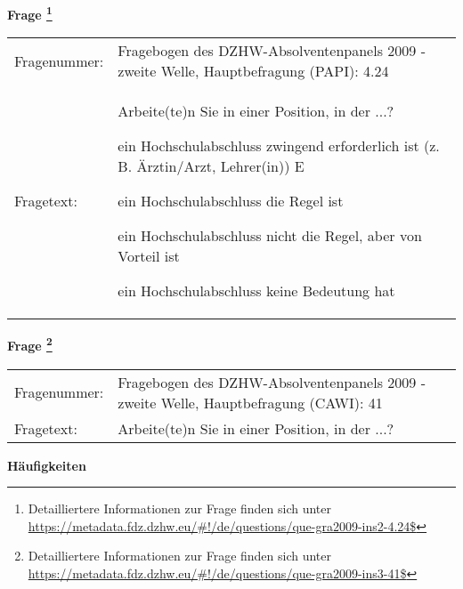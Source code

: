 				\vspace*{0.5cm}
                \noindent\textbf{Frage
	                \footnote{Detailliertere Informationen zur Frage finden sich unter
		              \url{https://metadata.fdz.dzhw.eu/\#!/de/questions/que-gra2009-ins2-4.24$}}}\\
				\begin{tabularx}{\hsize}{@{}lX}
					Fragenummer: &
					  Fragebogen des DZHW-Absolventenpanels 2009 - zweite Welle, Hauptbefragung (PAPI):
					  4.24
 \\
					Fragetext: & Arbeite(te)n Sie in einer Position, in der ...?\par  ein Hochschulabschluss zwingend erforderlich ist (z. B. Ärztin/Arzt, Lehrer(in)) E\par  ein Hochschulabschluss die Regel ist\par  ein Hochschulabschluss nicht die Regel, aber von Vorteil ist\par  ein Hochschulabschluss keine Bedeutung hat \\
				\end{tabularx}
				\vspace*{0.5cm}
                \noindent\textbf{Frage
	                \footnote{Detailliertere Informationen zur Frage finden sich unter
		              \url{https://metadata.fdz.dzhw.eu/\#!/de/questions/que-gra2009-ins3-41$}}}\\
				\begin{tabularx}{\hsize}{@{}lX}
					Fragenummer: &
					  Fragebogen des DZHW-Absolventenpanels 2009 - zweite Welle, Hauptbefragung (CAWI):
					  41
 \\
					Fragetext: & Arbeite(te)n Sie in einer Position, in der ...? \\
				\end{tabularx}





        		\vspace*{0.5cm}
                \noindent\textbf{Häufigkeiten}

